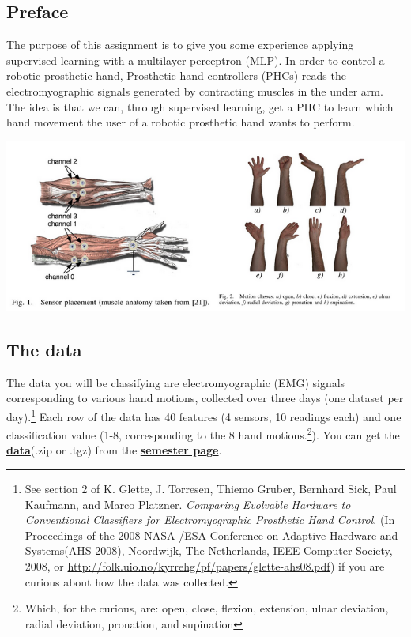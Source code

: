 \documentclass{article}           %
\begin{document}
\subsection*{Preface}
The purpose of this assignment is to give you some experience applying supervised learning with a multilayer perceptron (MLP).
In order to control a robotic prosthetic hand, Prosthetic hand controllers (PHCs) reads the electromyographic signals generated by contracting muscles in the under arm.
The idea is that we can, through supervised learning, get a PHC to learn which hand movement the user of a robotic prosthetic hand wants to perform.

\begin{center}
    \includegraphics[scale=0.8]{figures/handfigures.png}
\end{center}

\subsection*{The data}
 The data you will be classifying
are electromyographic (EMG) signals corresponding to various hand
motions, collected over three days (one dataset per day).\footnote{
See section 2 of K. Glette, J. Torresen, Thiemo Gruber, Bernhard Sick,
Paul Kaufmann, and Marco Platzner. \emph{Comparing Evolvable Hardware
to Conventional Classifiers for Electromyographic Prosthetic Hand
Control}. (In Proceedings of the 2008 NASA /ESA Conference on Adaptive
Hardware and Systems(AHS-2008), Noordwijk, The Netherlands, IEEE Computer
Society, 2008, or \url{http://folk.uio.no/kyrrehg/pf/papers/glette-ahs08.pdf})
if you are curious about how the data was collected.
} Each row of the data has 40 features (4 sensors, 10 readings each) and one classification value (1-8, corresponding to
the 8 hand motions.\footnote{
Which, for the curious, are: open, close, flexion, extension, ulnar
deviation, radial deviation, pronation, and supination
}). You can get the \href{http://www.uio.no/studier/emner/matnat/ifi/INF3490/h16/assignment-2}{\textbf{data}}(.zip or .tgz) from the \href{http://www.uio.no/studier/emner/matnat/ifi/INF3490/h16/index.html}{\textbf{semester page}}.
\end{document}
